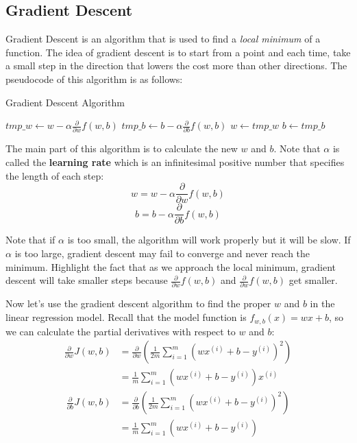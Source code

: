 \documentclass[a4paper, 12pt]{book}
\begin{document}
\subsection{Gradient Descent}
Gradient Descent is an algorithm that is used to find a \emph{local minimum} of a function. The idea of gradient descent is to start from a point and each time, take a small step in the direction that lowers the cost more than other directions. The pseudocode of this algorithm is as follows:

\begin{algorithm}
\caption{Gradient Descent Algorithm}
\begin{algorithmic} [1]
\Repeat
\State $tmp\_w \gets w - \alpha{\frac{\partial}{\partial w}}f(w,b)$
\State $tmp\_b \gets b - \alpha{\frac{\partial}{\partial b}}f(w,b)$
\State $w \gets tmp\_w$
\State $b \gets tmp\_b$
\end{algorithmic}
\end{algorithm}

The main part of this algorithm is to calculate the new $w$ and $b$. Note that $\alpha$ is called the \textbf{learning rate} which is an infinitesimal positive number that specifies the length of each step: \[w = w - \alpha {\frac{\partial}{\partial w}}f(w,b)\] \[b = b - \alpha {\frac{\partial}{\partial b}}f(w,b)\]

Note that if $\alpha$ is too small, the algorithm will work properly but it will be slow. If $\alpha$ is too large, gradient descent may fail to converge and never reach the minimum. Highlight the fact that as we approach the local minimum, gradient descent will take smaller steps because ${\frac{\partial}{\partial w}}f(w,b)$ and ${\frac{\partial}{\partial w}}f(w,b)$ get smaller.

Now let's use the gradient descent algorithm to find the proper $w$ and $b$ in the linear regression model. Recall that the model function is $f_{w,b}(x) = wx + b$, so we can calculate the partial derivatives with respect to $w$ and $b$: \[ \begin{split} {\frac{\partial}{\partial w}}J(w,b) & = \frac{\partial}{\partial w} (\frac{1}{2m} \sum_{i=1}^{m} (w{x^{(i)}} + b - y^{(i)})^2) \\ & = \frac{1}{m} \sum_{i=1}^{m} (w{x^{(i)}} + b - y^{(i)}){x^{(i)}}\end{split}\]
\[ \begin{split} {\frac{\partial}{\partial b}}J(w,b) & = \frac{\partial}{\partial b} (\frac{1}{2m} \sum_{i=1}^{m} (w{x^{(i)}} + b - y^{(i)})^2) \\ & = \frac{1}{m} \sum_{i=1}^{m} (w{x^{(i)}} + b - y^{(i)})\end{split}\]
\end{document}
